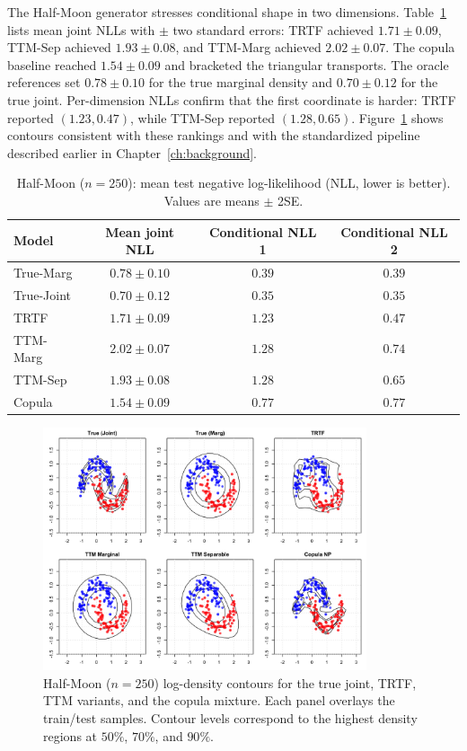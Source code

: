 \documentclass[11pt,a4paper,twoside]{book}\usepackage[]{graphicx}\usepackage[]{xcolor}
\begin{document}
The Half-Moon generator stresses conditional shape in two dimensions. Table~\ref{tab:halfmoon-nll} lists mean joint NLLs with $\pm$ two standard errors: TRTF achieved $1.71 \pm 0.09$, TTM-Sep achieved $1.93 \pm 0.08$, and TTM-Marg achieved $2.02 \pm 0.07$. The copula baseline reached $1.54 \pm 0.09$ and bracketed the triangular transports. The oracle references set $0.78 \pm 0.10$ for the true marginal density and $0.70 \pm 0.12$ for the true joint. Per-dimension NLLs confirm that the first coordinate is harder: TRTF reported $(1.23, 0.47)$, while TTM-Sep reported $(1.28, 0.65)$. Figure~\ref{fig:halfmoon-panels} shows contours consistent with these rankings and with the standardized pipeline described earlier in Chapter~\ref{ch:background}.

\begin{table}[htbp]
 \centering
\caption{Half-Moon ($n=250$): mean test negative log-likelihood (NLL, lower is better). Values are means $\pm$ 2SE.}
 \label{tab:halfmoon-nll}
 \begin{tabular}{lccc}
 \hline
 Model & Mean joint NLL & Conditional NLL 1 & Conditional NLL 2 \\
 \hline
 True-Marg & $0.78 \pm 0.10$ & $0.39$ & $0.39$ \\
 True-Joint & $0.70 \pm 0.12$ & $0.35$ & $0.35$ \\
 TRTF & $1.71 \pm 0.09$ & $1.23$ & $0.47$ \\
 TTM-Marg & $2.02 \pm 0.07$ & $1.28$ & $0.74$ \\
 TTM-Sep & $1.93 \pm 0.08$ & $1.28$ & $0.65$ \\
 Copula & $1.54 \pm 0.09$ & $0.77$ & $0.77$ \\
 \hline
 \end{tabular}
\end{table}

\begin{figure}[htbp]
 \centering
 \includegraphics[width=0.85\textwidth]{figure/halfmoon_panels_seed007_N250.png}
\caption{Half-Moon ($n=250$) log-density contours for the true joint, TRTF, TTM variants, and the copula mixture. Each panel overlays the train/test samples. Contour levels correspond to the highest density regions at $50\%$, $70\%$, and $90\%$.}
 \label{fig:halfmoon-panels}
\end{figure}
\end{document}

